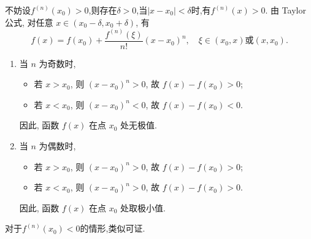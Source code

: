 \begin{solution}
    不妨设$f^{(n)}(x_0) > 0$,则存在$\delta > 0$,当$|x - x_0| < \delta$时,有$f^{(n)}(x) > 0$.
     由 Taylor 公式, 对任意 $x \in (x_0 - \delta, x_0 + \delta)$, 有
              $$f(x) = f(x_0) + \frac{f^{(n)}(\xi)}{n!}(x - x_0)^n, \quad \xi \in (x_0, x) \text{或} (x, x_0).$$
            \begin{enumerate}
        \item  当 $n$ 为奇数时, 
              \begin{itemize}
                \item 若 $x > x_0$, 则 $(x - x_0)^n > 0$, 故 $f(x) - f(x_0) > 0$;
                \item 若 $x < x_0$, 则 $(x - x_0)^n < 0$, 故 $f(x) - f(x_0) < 0$.
              \end{itemize}
                因此, 函数 $f(x)$ 在点 $x_0$ 处无极值.
        \item 当 $n$ 为偶数时,
                \begin{itemize}
                    \item 若 $x > x_0$, 则 $(x - x_0)^n > 0$, 故 $f(x) - f(x_0) > 0$;
                    \item 若 $x < x_0$, 则 $(x - x_0)^n > 0$, 故 $f(x) - f(x_0) > 0$.
                \end{itemize}
                    因此, 函数 $f(x)$ 在点 $x_0$ 处取极小值.
    \end{enumerate}
    对于$f^{(n)}(x_0) < 0$的情形,类似可证.
\end{solution}

\newpage